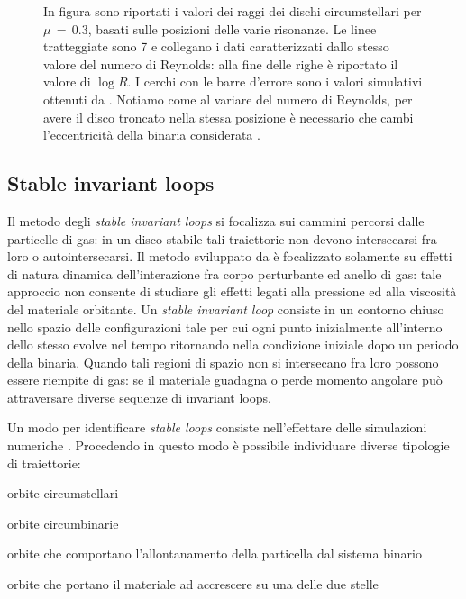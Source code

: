 \begin{figure}[h]
    \caption{In figura sono riportati i valori dei raggi dei dischi circumstellari per $\mu\,=\,0.3$, basati sulle posizioni delle varie risonanze. Le linee tratteggiate sono 7 e collegano i dati caratterizzati dallo stesso valore del numero di Reynolds: alla fine delle righe è riportato il valore di $\log{R}$. I cerchi con le barre d'errore sono i valori simulativi ottenuti da \textcite{ArtymowiczLubow1994}. Notiamo come al variare del numero di Reynolds, per avere il disco troncato nella stessa posizione è necessario che cambi l'eccentricità della binaria considerata \parencite{ArtymowiczLubow1994}.}
    \label{fig:dimdis_art}
\end{figure}

\subsection{Stable invariant loops}

Il metodo degli \textit{stable invariant loops} si focalizza sui cammini percorsi dalle particelle di gas: in un disco stabile tali traiettorie non devono intersecarsi fra loro o autointersecarsi. 
Il metodo sviluppato da \textcite{Pichardo2005} è focalizzato solamente su effetti di natura dinamica dell'interazione fra corpo perturbante ed anello di gas: tale approccio non consente di studiare gli effetti legati alla pressione ed alla viscosità del materiale orbitante.
Un \textit{stable invariant loop} consiste in un contorno chiuso nello spazio delle configurazioni tale per cui ogni punto inizialmente all'interno dello stesso evolve nel tempo ritornando nella condizione iniziale dopo un periodo della binaria.
Quando tali regioni di spazio non si intersecano fra loro possono essere riempite di gas: se il materiale guadagna o perde momento angolare  può attraversare diverse sequenze di invariant loops.

Un modo per identificare \textit{stable loops} consiste nell'effettare delle simulazioni numeriche \parencite{Pichardo2005}.
Procedendo in questo modo è possibile individuare diverse tipologie di traiettorie:
\begin{list}{\textbf{-}}{\setlength{\itemsep}{0cm}}
    \item orbite circumstellari
    \item orbite circumbinarie
    \item orbite che comportano l'allontanamento della particella dal sistema binario
    \item orbite che portano il materiale ad accrescere su una delle due stelle
\end{list}

